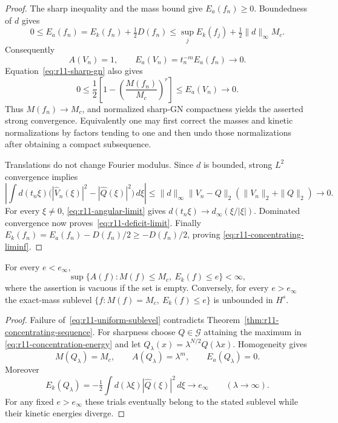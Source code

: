 \begin{proof}
The sharp inequality and the mass bound give $E_a(f_n)\ge0$.
Boundedness of $d$ gives
\[
 0\le E_a(f_n)=E_k(f_n)+\tfrac12D(f_n)
      \le \sup_j E_k(f_j)+\tfrac12\|d\|_\infty M_c.
\]
Consequently
\[
 A(V_n)=1,\qquad
 E_a(V_n)=t_n^{-m}E_a(f_n)\longrightarrow0.
\]
Equation~\eqref{eq:r11-sharp-gn} also gives
\[
 0\le\frac12\left[1-\left(\frac{M(f_n)}{M_c}\right)^r\right]
      \le E_a(V_n)\longrightarrow0.
\]
Thus $M(f_n)\to M_c$, and normalized sharp-GN compactness yields
the asserted strong convergence.  Equivalently one may first correct
the masses and kinetic normalizations by factors tending to one and
then undo those normalizations after obtaining a compact subsequence.

Translations do not change Fourier modulus.  Since $d$ is bounded,
strong $L^2$ convergence implies
\[
 \left|\int d(t_n\xi)
      \bigl(|\widehat V_n(\xi)|^2-|\widehat Q(\xi)|^2\bigr)\,d\xi\right|
 \le\|d\|_\infty\|V_n-Q\|_2(\|V_n\|_2+\|Q\|_2)
 \longrightarrow0.
\]
For every $\xi\ne0$, \eqref{eq:r11-angular-limit} gives
$d(t_n\xi)\to d_\infty(\xi/|\xi|)$.  Dominated convergence now
proves~\eqref{eq:r11-deficit-limit}.  Finally
$E_k(f_n)=E_a(f_n)-D(f_n)/2\ge-D(f_n)/2$, proving
\eqref{eq:r11-concentrating-liminf}.
\end{proof}

\begin{corollary}
\label{cor:r11-sublevels}
For every $e<e_\infty$,
\begin{equation}\label{eq:r11-uniform-sublevel}
 \sup\{A(f):M(f)\le M_c,\ E_k(f)\le e\}<\infty,
\end{equation}
where the assertion is vacuous if the set is empty.
Conversely, for every $e>e_\infty$ the exact-mass sublevel
$\{f:M(f)=M_c,\ E_k(f)\le e\}$ is unbounded in $H^s$.
\end{corollary}

\begin{proof}
Failure of~\eqref{eq:r11-uniform-sublevel} contradicts
Theorem~\ref{thm:r11-concentrating-sequence}.  For sharpness choose
$Q\in\mathcal G$ attaining the maximum in
\eqref{eq:r11-concentration-energy} and let
$Q_\lambda(x)=\lambda^{N/2}Q(\lambda x)$.  Homogeneity gives
\[
 M(Q_\lambda)=M_c,\qquad A(Q_\lambda)=\lambda^m,\qquad
 E_a(Q_\lambda)=0.
\]
Moreover
\[
 E_k(Q_\lambda)=-\tfrac12\int d(\lambda\xi)|\widehat Q(\xi)|^2\,d\xi
      \longrightarrow e_\infty
      \qquad(\lambda\longrightarrow\infty).
\]
For any fixed $e>e_\infty$ these trials eventually belong to the
stated sublevel while their kinetic energies diverge.
\end{proof}

